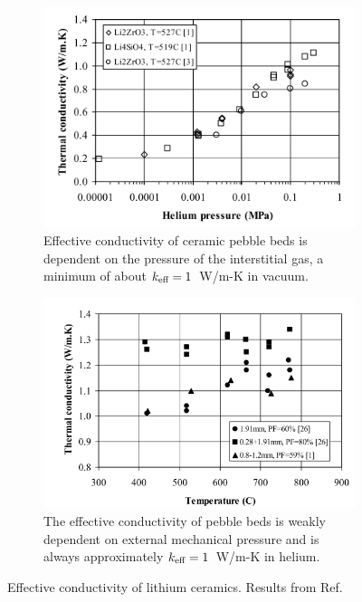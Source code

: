 \begin{figure}
        \centering
        \begin{subfigure}[b]{\doubleimagewidth}
                \includegraphics[width=\textwidth]{chapters/figures/keff-pressure}
                \caption{Effective conductivity of ceramic pebble beds is dependent on the pressure of the interstitial gas, a minimum of about $k_\text{eff} = 1$~W/m-K in vacuum.}
                \label{fig:keff-pressure}
        \end{subfigure}%
        
        \begin{subfigure}[b]{\doubleimagewidth 	}
                \includegraphics[width=\textwidth]{chapters/figures/lit-keff-exp}
                \caption{The effective conductivity of pebble beds is weakly dependent on external mechanical pressure and is always approximately $k_\text{eff} = 1$~W/m-K in helium.}
                \label{fig:keff-lit}
        \end{subfigure}
        \caption{Effective conductivity of lithium ceramics. Results from Ref.~\cite{Abou-Sena2005}}\label{fig:keff}
\end{figure}

